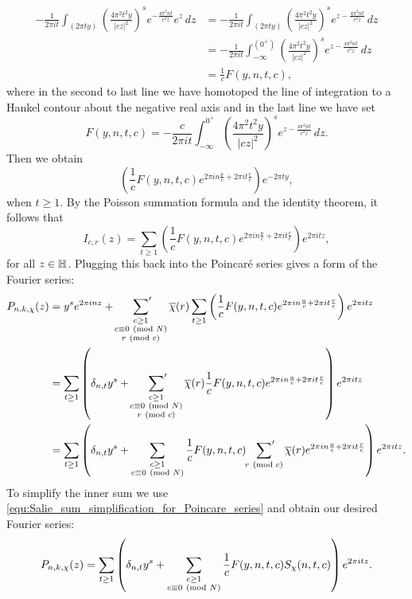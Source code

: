     \begin{align*}
      -\frac{1}{2\pi it}\int_{(2\pi ty)}\left(\frac{4\pi^{2}t^{2}y}{|cz|^{2}}\right)^{s}e^{-\frac{4\pi^{2}nt}{c^{2}z}}e^{z}\,dz &= -\frac{1}{2\pi it}\int_{(2\pi ty)}\left(\frac{4\pi^{2}t^{2}y}{|cz|^{2}}\right)^{s}e^{z-\frac{4\pi^{2}nt}{c^{2}z}}\,dz \\
      &= -\frac{1}{2\pi it}\int_{-\infty}^{(0^{+})}\left(\frac{4\pi^{2}t^{2}y}{|cz|^{2}}\right)^{s}e^{z-\frac{4\pi^{2}nt}{c^{2}z}}\,dz \\
      &= \frac{1}{c}F(y,n,t,c),
    \end{align*}
    where in the second to last line we have homotoped the line of integration to a Hankel contour about the negative real axis and in the last line we have set
    \[
      F(y,n,t,c) = -\frac{c}{2\pi it}\int_{-\infty}^{0^{+}}\left(\frac{4\pi^{2}t^{2}y}{|cz|^{2}}\right)^{s}e^{z-\frac{4\pi^{2}nt}{c^{2}z}}\,dz.
    \]
    Then we obtain
    \[
      \left(\frac{1}{c}F(y,n,t,c)e^{2\pi in\frac{a}{c}+2\pi it\frac{r}{c}}\right)e^{-2\pi ty},
    \]
    when $t \ge 1$. By the Poisson summation formula and the identity theorem, it follows that
    \[
      I_{c,r}(z) = \sum_{t \ge 1}\left(\frac{1}{c}F(y,n,t,c)e^{2\pi in\frac{a}{c}+2\pi it\frac{r}{c}}\right)e^{2\pi itz},
    \]
    for all $z \in \mathbb{H}$. Plugging this back into the Poincar\'e series gives a form of the Fourier series:
    \begin{align*}
      P_{n,k,\chi}(z) &= y^{s}e^{2\pi inz}+\sideset{}{'}\sum_{\substack{c \ge 1 \\ c \equiv 0 \ \left(\text{mod }N\right) \\ r \ \left(\text{mod }c\right)}}\overline{\chi}(r)\sum_{t \ge 1}\left(\frac{1}{c}F(y,n,t,c)e^{2\pi in\frac{a}{c}+2\pi it\frac{r}{c}}\right)e^{2\pi itz} \\
      &= \sum_{t \ge 1}\left(\delta_{n,t}y^{s}+\sideset{}{'}\sum_{\substack{c \ge 1 \\ c \equiv 0 \ \left(\text{mod }N\right) \\ r \ \left(\text{mod }c\right)}}\overline{\chi}(r)\frac{1}{c}F(y,n,t,c)e^{2\pi in\frac{a}{c}+2\pi it\frac{r}{c}}\right)e^{2\pi itz} \\
      &= \sum_{t \ge 1}\left(\delta_{n,t}y^{s}+\sum_{\substack{c \ge 1 \\ c \equiv 0 \ \left(\text{mod }N\right)}}\frac{1}{c}F(y,n,t,c)\sideset{}{'}\sum_{r \ \left(\text{mod }c\right)}\overline{\chi}(r)e^{2\pi in\frac{a}{c}+2\pi it\frac{r}{c}}\right)e^{2\pi itz}.
    \end{align*}
    To simplify the inner sum we use \cref{equ:Salie_sum_simplification_for_Poincare_series} and obtain our desired Fourier series:
    \[
      P_{n,k,\chi}(z) = \sum_{t \ge 1}\left(\delta_{n,t}y^{s}+\sum_{\substack{c \ge 1 \\ c \equiv 0 \ \left(\text{mod }N\right)}}\frac{1}{c}F(y,n,t,c)S_{\chi}(n,t,c)\right)e^{2\pi itz}.
    \]
